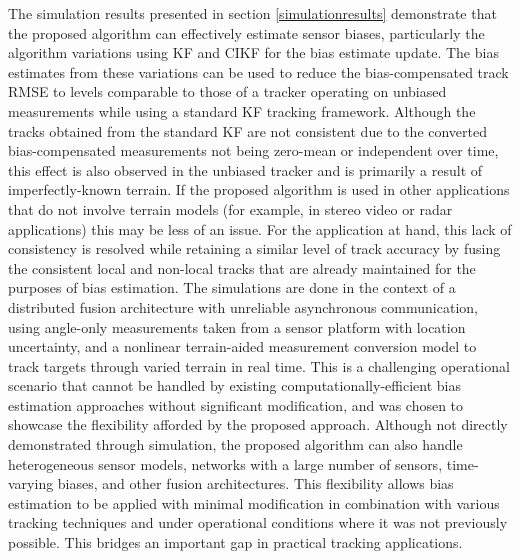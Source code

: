 \documentclass[journal]{IEEEtran}
\begin{document}
The simulation results presented in section \ref{simulationresults} demonstrate that the proposed algorithm can effectively estimate sensor biases, particularly the algorithm variations using KF and CIKF for the bias estimate update. The bias estimates from these variations can be used to reduce the bias-compensated track RMSE to levels comparable to those of a tracker operating on unbiased measurements while using a standard KF tracking framework. Although the tracks obtained from the standard KF are not consistent due to the converted bias-compensated measurements not being zero-mean or independent over time, this effect is also observed in the unbiased tracker and is primarily a result of imperfectly-known terrain. If the proposed algorithm is used in other applications that do not involve terrain models (for example, in stereo video or radar applications) this may be less of an issue. For the application at hand, this lack of consistency is resolved while retaining a similar level of track accuracy by fusing the consistent local and non-local tracks that are already maintained for the purposes of bias estimation. The simulations are done in the context of a distributed fusion architecture with unreliable asynchronous communication, using angle-only measurements taken from a sensor platform with location uncertainty, and a nonlinear terrain-aided measurement conversion model to track targets through varied terrain in real time. This is a challenging operational scenario that cannot be handled by existing computationally-efficient bias estimation approaches without significant modification, and was chosen to showcase the flexibility afforded by the proposed approach. Although not directly demonstrated through simulation, the proposed algorithm can also handle heterogeneous sensor models, networks with a large number of sensors, time-varying biases, and other fusion architectures. This flexibility allows bias estimation to be applied with minimal modification in combination with various tracking techniques and under operational conditions where it was not previously possible. This bridges an important gap in practical tracking applications.

\end{document}
